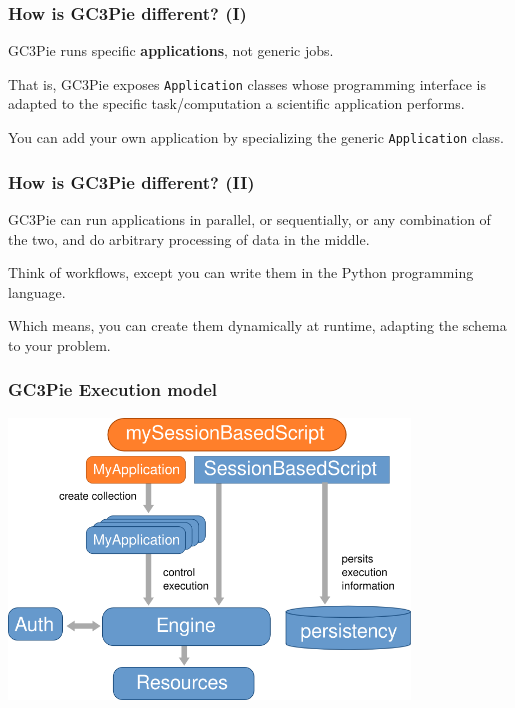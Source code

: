 \documentclass[english,serif,mathserif,xcolor=pdftex,dvipsnames,table]{beamer}
\begin{document}
\begin{frame}
  \frametitle{How is GC3Pie different? (I)}

  \begin{block}{}
    GC3Pie runs specific \textbf{applications}, not generic jobs.
  \end{block}

   \begin{block}{}
     That is, GC3Pie exposes \texttt{Application} classes whose programming
    interface is adapted to the specific task/computation a scientific
    application performs.
  \end{block}

  \begin{block}{}
    You can add your own application by specializing the generic
    \texttt{Application} class.
  \end{block}
\end{frame}

\begin{frame}
  \frametitle{How is GC3Pie different? (II)}

  \begin{block}{}
    GC3Pie can run applications in parallel, or sequentially, or any
    combination of the two, and do arbitrary processing of data in the
    middle.
  \end{block}

  \begin{block}{}
    Think of {\color{Blue}workflows}, except you can write them in the Python
    programming language.
  \end{block}

  \begin{block}{}
    Which means, you can create them dynamically at runtime, adapting
    the schema to your problem.
  \end{block}
\end{frame}

\begin{frame}
  \frametitle{GC3Pie Execution model}
  \includegraphics[width=0.8\textwidth]{fig/GC3Pie_execution_model}
\end{frame}
\end{document}
